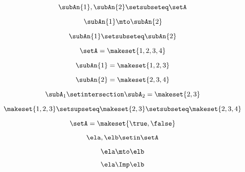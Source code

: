 \begin{forslides}
    \begin{equation}
        \label{eq:systems-023}
        \subAn{1}, \subAn{2} \setsubseteq \setA
    \end{equation}

    \begin{equation}
        \label{eq:systems-024}
        \subAn{1} \mto \subAn{2}
    \end{equation}

    \begin{equation}
        \label{eq:systems-025}
        \subAn{1} \setsubseteq \subAn{2}
    \end{equation}

    \begin{equation}
        \label{eq:systems-026}
        \setA = \makeset{ 1, 2, 3, 4 }
    \end{equation}

    \begin{equation}
        \label{eq:systems-027}
        \subAn{1} = \makeset{ 1, 2, 3 }
    \end{equation}

    \begin{equation}
        \label{eq:systems-028}
        \subAn{2} = \makeset{2, 3, 4 }
    \end{equation}

    \begin{equation}
        \label{eq:systems-029}
        \subA_1 \setintersection \subA_2 = \makeset{2, 3 }
    \end{equation}

    \begin{equation}
        \label{eq:systems-030}
        \makeset{ 1, 2, 3 } \setsupseteq \makeset{2, 3 } \setsubseteq \makeset{2, 3, 4 }
    \end{equation}

    \begin{equation}
        \label{eq:systems-031}
        \setA = \makeset{ \true, \false }
    \end{equation}

    \begin{equation}
        \label{eq:systems-032}
        \ela, \elb  \setin \setA
    \end{equation}

    \begin{equation}
        \label{eq:systems-033}
        \ela \mto \elb
    \end{equation}

    \begin{equation}
        \label{eq:systems-034}
        \ela \Imp \elb
    \end{equation}


\end{forslides}
